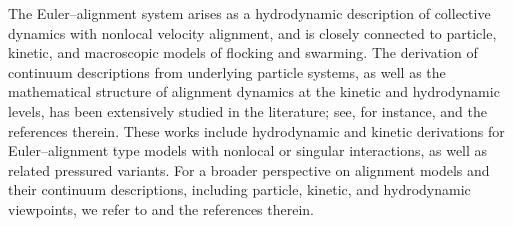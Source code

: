 \documentclass[11pt]{amsart}
\numberwithin{equation}{section}
\theoremstyle{definition}
\theoremstyle{remark}
\numberwithin{equation}{section}
\begin{document}
The Euler--alignment system arises as a hydrodynamic description of collective dynamics with nonlocal velocity alignment, and is closely connected to particle, kinetic, and macroscopic models of flocking and swarming. The derivation of continuum descriptions from underlying particle systems, as well as the mathematical structure of alignment dynamics at the kinetic and hydrodynamic levels, has been extensively studied in the literature; see, for instance, \cite{CC21,CCJ21, CFP25, CH24, CJ24, CK23, FP24, FK19, HL09, HT08, KMT15} and the references therein. These works include hydrodynamic and kinetic derivations for Euler--alignment type models with nonlocal or singular interactions, as well as related pressured variants. For a broader perspective on alignment models and their continuum descriptions, including particle, kinetic, and hydrodynamic viewpoints, we refer to \cite{CCTpre, CCP17, CHL17, Shv21, Shv24, Tad21} and the references therein.
\end{document}
